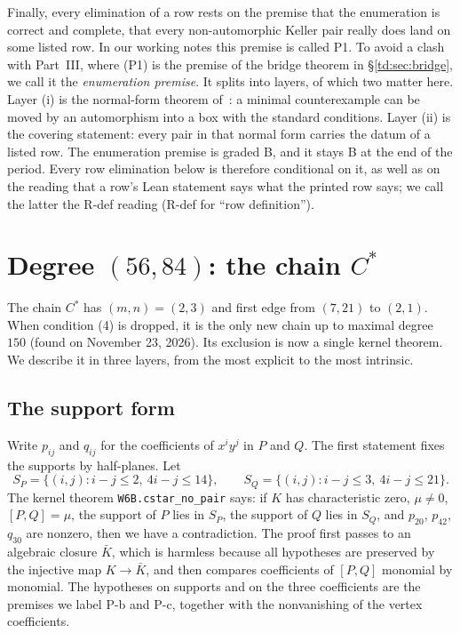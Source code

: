 \documentclass[a4paper,11pt]{article}
\theoremstyle{jsplain}
\theoremstyle{jsdef}
\theoremstyle{jsrem}
\begin{document}
Finally, every elimination of a row rests on the premise that the enumeration is correct and complete, that every non-automorphic Keller pair really does land on some listed row. In our working notes this premise is called P1. To avoid a clash with Part~III, where (P1) is the premise of the bridge theorem in \S\ref{td:sec:bridge}, we call it the \emph{enumeration premise}. It splits into layers, of which two matter here. Layer (i) is the normal-form theorem of~\cite{GGV1}: a minimal counterexample can be moved by an automorphism into a box with the standard conditions. Layer (ii) is the covering statement: every pair in that normal form carries the datum of a listed row. The enumeration premise is graded B, and it stays B at the end of the period. Every row elimination below is therefore conditional on it, as well as on the reading that a row's Lean statement says what the printed row says; we call the latter the R-def reading (R-def for ``row definition'').

\section{Degree \texorpdfstring{$(56,84)$}{(56,84)}: the chain \texorpdfstring{$C^*$}{C*}}\label{rp:sec:cstar}

The chain $C^*$ has $(m,n)=(2,3)$ and first edge from $(7,21)$ to $(2,1)$. When condition (4) is dropped, it is the only new chain up to maximal degree $150$ (found on November 23, 2026). Its exclusion is now a single kernel theorem. We describe it in three layers, from the most explicit to the most intrinsic.

\subsection{The support form}

Write $p_{ij}$ and $q_{ij}$ for the coefficients of $x^iy^j$ in $P$ and $Q$. The first statement fixes the supports by half-planes. Let
\[
S_P=\{(i,j): i-j\le 2,\ 4i-j\le 14\},\qquad S_Q=\{(i,j): i-j\le 3,\ 4i-j\le 21\}.
\]
The kernel theorem \texttt{W6B.\allowbreak{}cstar\_\allowbreak{}no\_\allowbreak{}pair} says: if $K$ has characteristic zero, $\mu\ne0$, $[P,Q]=\mu$, the support of $P$ lies in $S_P$, the support of $Q$ lies in $S_Q$, and $p_{20}$, $p_{42}$, $q_{30}$ are nonzero, then we have a contradiction. The proof first passes to an algebraic closure $\bar K$, which is harmless because all hypotheses are preserved by the injective map $K\to\bar K$, and then compares coefficients of $[P,Q]$ monomial by monomial. The hypotheses on supports and on the three coefficients are the premises we label P-b and P-c, together with the nonvanishing of the vertex coefficients.
\end{document}
